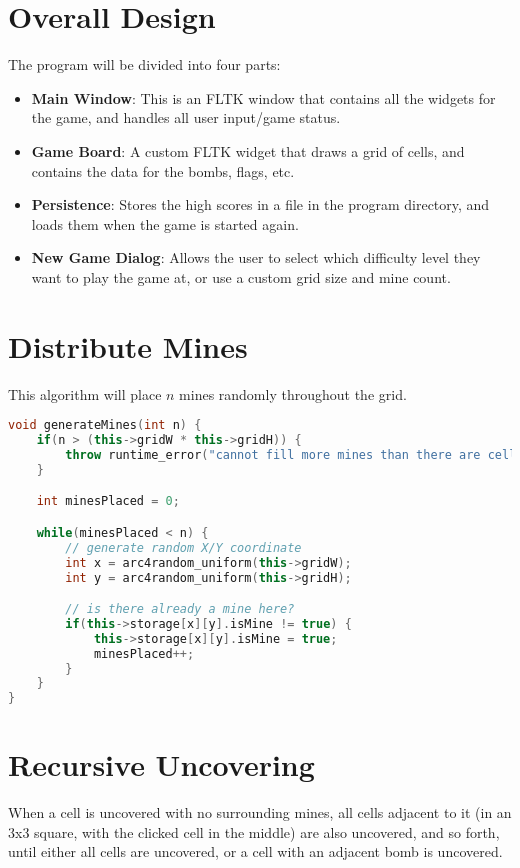 \documentclass[11pt]{article}
\begin{document}
\section{Overall Design}
The program will be divided into four parts:

\begin{itemize}
	\item \textbf{Main Window}: This is an FLTK window that contains all the widgets for the game, and handles all user input/game status.
	\item \textbf{Game Board}: A custom FLTK widget that draws a grid of cells, and contains the data for the bombs, flags, etc.
	\item \textbf{Persistence}: Stores the high scores in a file in the program directory, and loads them when the game is started again.
	\item \textbf{New Game Dialog}: Allows the user to select which difficulty level they want to play the game at, or use a custom grid size and mine count.
\end{itemize}

\section{Distribute Mines}
This algorithm will place $n$ mines randomly throughout the grid.

\begin{lstlisting}[frame=single,language=C++]
void generateMines(int n) {
	if(n > (this->gridW * this->gridH)) {
		throw runtime_error("cannot fill more mines than there are cells");
	}

	int minesPlaced = 0;

	while(minesPlaced < n) {
		// generate random X/Y coordinate
		int x = arc4random_uniform(this->gridW);
		int y = arc4random_uniform(this->gridH);

		// is there already a mine here?
		if(this->storage[x][y].isMine != true) {
			this->storage[x][y].isMine = true;
			minesPlaced++;
		}
	}
}
\end{lstlisting}

\section{Recursive Uncovering}
When a cell is uncovered with no surrounding mines, all cells adjacent to it (in an 3x3 square, with the clicked cell in the middle) are also uncovered, and so forth, until either all cells are uncovered, or a cell with an adjacent bomb is uncovered.
\end{document}
